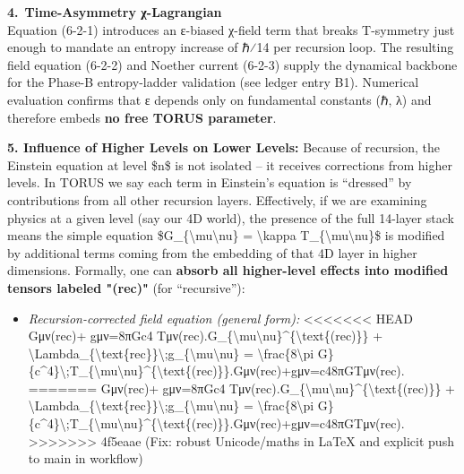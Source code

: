 \documentclass[]{article}
\begin{document}
\textbf{4. Time-Asymmetry χ-Lagrangian}\\
Equation (6-2-1) introduces an ε-biased χ-field term that breaks
T-symmetry just enough to mandate an entropy increase of ℏ⁄14 per
recursion loop. The resulting field equation (6-2-2) and Noether current
(6-2-3) supply the dynamical backbone for the Phase-B entropy-ladder
validation (see ledger entry B1). Numerical evaluation confirms that ε
depends only on fundamental constants (ℏ, λ) and therefore embeds
\textbf{no free TORUS parameter}.

\textbf{5. Influence of Higher Levels on Lower Levels:} Because of
recursion, the Einstein equation at level \$n\$ is not isolated -- it
receives corrections from higher levels. In TORUS we say each term in
Einstein's equation is ``dressed'' by contributions from all other
recursion layers​. Effectively, if we are examining physics at a given
level (say our 4D world), the presence of the full 14-layer stack means
the simple equation \$G\_\{\textbackslash{}mu\textbackslash{}nu\} =
\textbackslash{}kappa T\_\{\textbackslash{}mu\textbackslash{}nu\}\$ is
modified by additional terms coming from the embedding of that 4D layer
in higher dimensions. Formally, one can \textbf{absorb all higher-level
effects into modified tensors labeled "(rec)"} (for ``recursive'')​:

\begin{itemize}
\item
  \emph{Recursion-corrected field equation (general form):}
<<<<<<< HEAD
  Gμν(rec)+\Lambdarec  gμν=8πGc4  Tμν(rec).G\_\{\textbackslash mu\textbackslash nu\}\^{}\{\textbackslash text\{(rec)\}\}
  +
  \textbackslash Lambda\_\{\textbackslash text\{rec\}\}\textbackslash;g\_\{\textbackslash mu\textbackslash nu\}
  = \textbackslash frac\{8\textbackslash pi
  G\}\{c\^{}4\}\textbackslash;T\_\{\textbackslash mu\textbackslash nu\}\^{}\{\textbackslash text\{(rec)\}\}.Gμν(rec)\hspace{0pt}+\Lambdarec\hspace{0pt}gμν\hspace{0pt}=c48πG\hspace{0pt}Tμν(rec)\hspace{0pt}.
=======
  Gμν(rec)+\Lambdarec  gμν=8πGc4  Tμν(rec).G\_\{\textbackslash{}mu\textbackslash{}nu\}\^{}\{\textbackslash{}text\{(rec)\}\}
  +
  \textbackslash{}Lambda\_\{\textbackslash{}text\{rec\}\}\textbackslash{};g\_\{\textbackslash{}mu\textbackslash{}nu\}
  = \textbackslash{}frac\{8\textbackslash{}pi
  G\}\{c\^{}4\}\textbackslash{};T\_\{\textbackslash{}mu\textbackslash{}nu\}\^{}\{\textbackslash{}text\{(rec)\}\}.Gμν(rec)​+\Lambdarec​gμν​=c48πG​Tμν(rec)​.
>>>>>>> 4f5eaae (Fix: robust Unicode/maths in LaTeX and explicit push to main in workflow)
\end{itemize}
\end{document}

